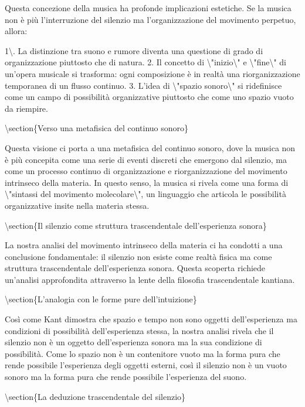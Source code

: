 \documentclass[a4paper,11pt]{article}
\begin{document}
Questa concezione della musica ha profonde implicazioni estetiche. Se la
musica non \`e pi\`u l'interruzione del silenzio ma l'organizzazione del
movimento perpetuo, allora:

1\textbackslash{}. La distinzione tra suono e rumore diventa una questione di grado di
organizzazione piuttosto che di natura. 2. Il concetto di \textbackslash{}"inizio\textbackslash{}" e
\textbackslash{}"fine\textbackslash{}" di un'opera musicale si trasforma: ogni composizione \`e in
realt\`a una riorganizzazione temporanea di un flusso continuo. 3. L'idea
di \textbackslash{}"spazio sonoro\textbackslash{}" si ridefinisce come un campo di possibilit\`a
organizzative piuttosto che come uno spazio vuoto da riempire.

\textbackslash{}section\{Verso una metafisica del continuo sonoro\}

Questa visione ci porta a una metafisica del continuo sonoro, dove la
musica non \`e pi\`u concepita come una serie di eventi discreti che
emergono dal silenzio, ma come un processo continuo di organizzazione e
riorganizzazione del movimento intrinseco della materia. In questo
senso, la musica si rivela come una forma di \textbackslash{}"sintassi del movimento
molecolare\textbackslash{}", un linguaggio che articola le possibilit\`a organizzative
insite nella materia stessa.

\textbackslash{}section\{Il silenzio come struttura trascendentale dell'esperienza sonora\}

La nostra analisi del movimento intrinseco della materia ci ha condotti
a una conclusione fondamentale: il silenzio non esiste come realt\`a
fisica ma come struttura trascendentale dell'esperienza sonora. Questa
scoperta richiede un'analisi approfondita attraverso la lente della
filosofia trascendentale kantiana.

\textbackslash{}section\{L'analogia con le forme pure dell'intuizione\}

Cos\`i come Kant dimostra che spazio e tempo non sono oggetti
dell'esperienza ma condizioni di possibilit\`a dell'esperienza stessa, la
nostra analisi rivela che il silenzio non \`e un oggetto dell'esperienza
sonora ma la sua condizione di possibilit\`a. Come lo spazio non \`e un
contenitore vuoto ma la forma pura che rende possibile l'esperienza
degli oggetti esterni, cos\`i il silenzio non \`e un vuoto sonoro ma la
forma pura che rende possibile l'esperienza del suono.

\textbackslash{}section\{La deduzione trascendentale del silenzio\}
\end{document}
